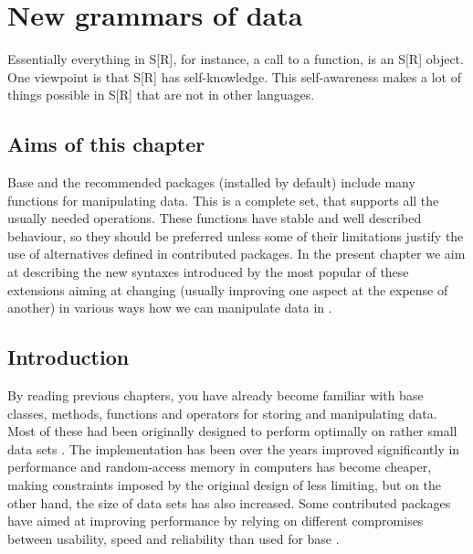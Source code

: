 \documentclass[krantz2]{krantz}\usepackage{knitr}%
\begin{document}



\chapter{New grammars of data}\label{chap:R:data}

\begin{VF}
Essentially everything in S[R], for instance, a call to a function, is an S[R] object. One viewpoint is that S[R] has self-knowledge. This self-awareness makes a lot of things possible in S[R] that are not in other languages.

\end{VF}




\section{Aims of this chapter}

Base \Rlang and the recommended packages (installed by default) include many functions for manipulating data. This is a complete set, that supports all the usually needed operations. These functions have stable and well described behaviour, so they should be preferred unless some of their limitations justify the use of alternatives defined in contributed packages. In the present chapter we aim at describing the new syntaxes introduced by the most popular of these extensions aiming at changing (usually improving one aspect at the expense of another) in various ways how we can manipulate data in \Rlang.

\section{Introduction}

By reading previous chapters, you have already become familiar with base \Rlang classes, methods, functions and operators for storing and manipulating data. Most of these had been originally designed to perform optimally on rather small data sets \autocite[see][]{Matloff2011}. The \Rlang implementation has been over the years improved significantly in performance and random-access memory in computers has become cheaper, making constraints imposed by the original design of \Rlang less limiting, but on the other hand, the size of data sets has also increased. Some contributed packages have aimed at improving performance by relying on different compromises between usability, speed and reliability than used for base \Rlang.
\end{document}
